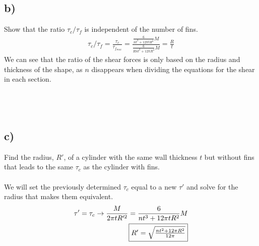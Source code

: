 \documentclass[12 pt]{article}
\begin{document}
\pagebreak
\subsection*{b)}
Show that the ratio $\tau_c/\tau_f$ is independent of the number of fins.
\begin{align*}
    \tau_c/\tau_f=\frac{\tau_c}{\tau_{f_{max}}}=\frac{\frac{6}{nt^3+12\pi tR^2}M}{\frac{6}{Rnt^2+12\pi R^3}M}=\frac{R}{t}
\end{align*}
We can see that the ratio of the shear forces is only based on the radius and thickness of the shape, as $n$ disappears
when dividing the equations for the shear in each section.
\\ \\ \\ \\

\subsection*{c)}
Find the radius, $R'$, of a cylinder with the same wall thickness $t$ but without fins that leads
to the same $\tau_c$ as the cylinder with fins. \\ \\
We will set the previously determined $\tau_c$ equal to a new $\tau'$ and solve for the radius that makes them
equivalent.
\begin{align*}
    \tau'=\tau_c \rightarrow \frac{M}{2\pi tR'^2}=\frac{6}{nt^3+12\pi tR^2}M \\
    \fbox{$R'=\sqrt{\frac{nt^2+12\pi R^2}{12\pi }}$}
\end{align*}

\pagebreak
\end{document}
